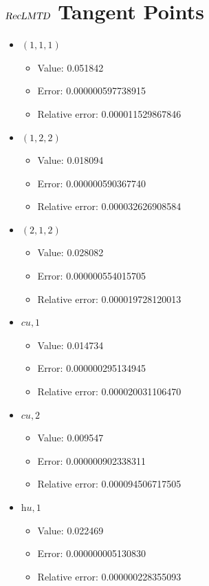 \documentclass{article}%
\begin{document}
\section{$\textsl{RecLMTD}$ Tangent Points}%
\thispagestyle{plain}%
\begin{itemize}%
	\item $(1, 1, 1)$%
	\begin{itemize}%
		\item Value: 0.051842%
		\item Error: 0.000000597738915%
		\item Relative error: 0.000011529867846%
	\end{itemize}%
	\item $(1, 2, 2)$%
	\begin{itemize}%
		\item Value: 0.018094%
		\item Error: 0.000000590367740%
		\item Relative error: 0.000032626908584%
	\end{itemize}%
	\item $(2, 1, 2)$%
	\begin{itemize}%
		\item Value: 0.028082%
		\item Error: 0.000000554015705%
		\item Relative error: 0.000019728120013%
	\end{itemize}%
	\item $\textit{cu},1$%
	\begin{itemize}%
		\item Value: 0.014734%
		\item Error: 0.000000295134945%
		\item Relative error: 0.000020031106470%
	\end{itemize}%
	\item $\textit{cu},2$%
	\begin{itemize}%
		\item Value: 0.009547%
		\item Error: 0.000000902338311%
		\item Relative error: 0.000094506717505%
	\end{itemize}%
	\item $\textit{hu},1$%
	\begin{itemize}%
		\item Value: 0.022469%
		\item Error: 0.000000005130830%
		\item Relative error: 0.000000228355093%
	\end{itemize}%
\end{itemize}%
\end{document}
